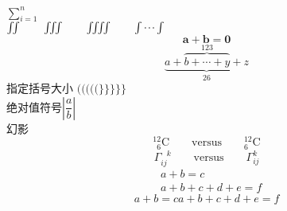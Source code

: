 \documentclass{article}
\begin{document}
\newpage
\flushleft
\(\sum\limits_{i=1}^{n}\)\\
$\iint \qquad \iiint \qquad \iiiint \qquad \idotsint$\\
$$\bm{a}+\bm{b}=\bm{0}$$
$$\underbrace{ a + \overbrace{b +\cdots + y}^{123} +z }_{26}$$
指定括号大小
$(\big(\Big(\bigg(\Bigg($\quad$\}\big\}\Big\}\bigg\}\Bigg\}$\\
绝对值符号$\left\vert\dfrac{a}{b}\right\vert$\\
幻影
\begin{displaymath}
{}^{12}_{\phantom{1}6}\textrm{C} \qquad
\textrm{versus} \qquad
{}^{12}_{6}\textrm{C}
\end{displaymath}
\begin{displaymath}
\Gamma_{ij}^{\phantom{ij}k} \qquad
\textrm{versus} \qquad
\Gamma_{ij}^{k}
\end{displaymath}
\begin{equation}
\begin{aligned}
&a+b=c\\
&a+b+c+d+e=f
\end{aligned}
\end{equation}
\begin{subequations}
	\begin{equation}
	a+b=c
	\end{equation}
	\begin{equation}
	a+b+c+d+e=f
	\end{equation}
\end{subequations}
\end{document}
